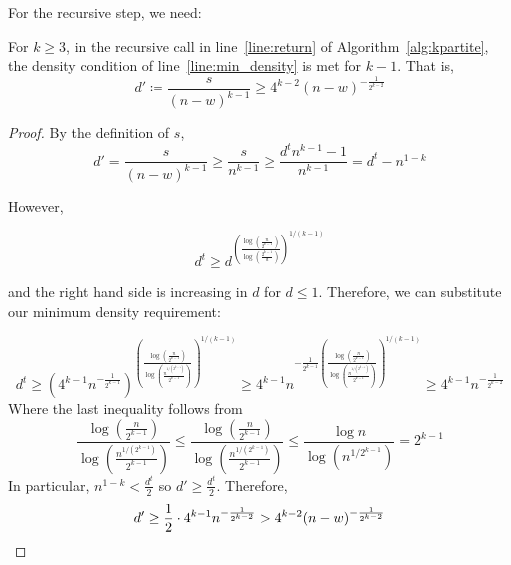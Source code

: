 For the recursive step, we need:

\begin{lemma}
    For $k \geq 3$, in the recursive call in line~\ref{line:return} of Algorithm~\ref{alg:kpartite},
    the density condition of line~\ref{line:min_density} is met for $k-1$.
    That is,
    \[
        d' \coloneqq \frac{s}{(n-w)^{k-1}} \geq 4^{k-2} (n-w)^{-\frac{1}{2^{k-2}}}
    \]

    \begin{proof}
        By the definition of $s$,
        \[
            d' =
            \frac{s}{(n-w)^{k-1}} \geq
            \frac{s}{n^{k-1}} \geq
            \frac{d^t n^{k-1} - 1 }{n^{k-1}} =
            d^t - n^{1-k}
        \]

        However,

        \[
            d^t \geq
            d^{\left( \frac{\log \left(\frac{n}{2^{k-1}}\right)}{\log \left(\frac{2^{k-1}}{d}\right)} \right)^{1/(k-1)}}
        \]

        and the right hand side is increasing in $d$ for $d \leq 1$.
        Therefore, we can substitute our minimum density requirement:
        
        \[
            d^t \geq
            \left( 4^{k-1}n^{-\frac{1}{2^{k-1}}}\right)^
                {\left( \frac{\log \left(\frac{n}{2^{k-1}}\right)}
                {\log \left( \frac{n^{1 / \left(2^{k-1}\right)}}{2^{k-1}}\right)} \right)^{1/(k-1)}} \geq
            4^{k-1}  n^{-\frac{1}{2^{k-1}}
                \left( \frac{\log \left(\frac{n}{2^{k-1}}\right)}
                {\log \left( \frac{n^{1 / \left(2^{k-1}\right)}}{2^{k-1}}\right)} \right)^{1/(k-1)}} \geq
            4^{k-1}  n^{-\frac{1}{2^{k-2}}}
        \]
        Where the last inequality follows from
        \[
            \frac{\log \left(\frac{n}{2^{k-1}}\right)}
                {\log \left( \frac{n^{1 / \left(2^{k-1}\right)}}{2^{k-1}}\right)} \leq
            \frac{\log \left(\frac{n}{2^{k-1}}\right)}
                {\log \left( \frac{n^{1 / \left(2^{k-1}\right)}}{2^{k-1}}\right)} \leq
            \frac{\log n}{\log (n^{1/2^{k-1}})} =
            2^{k-1}
        \]
        In particular, $n^{1-k} < \frac{d^t}{2}$ so $d' \geq \frac{d^t}{2}$.
        Therefore,
        \[
            d' \geq
            \frac{1}{2} \cdot 4^{k-1}n^{-\frac{1}{2^{k-2}}} >
            4^{k-2} (n-w)^{-\frac{1}{2^{k-2}}} \qedhere
        \]
    \end{proof}

\end{lemma}

